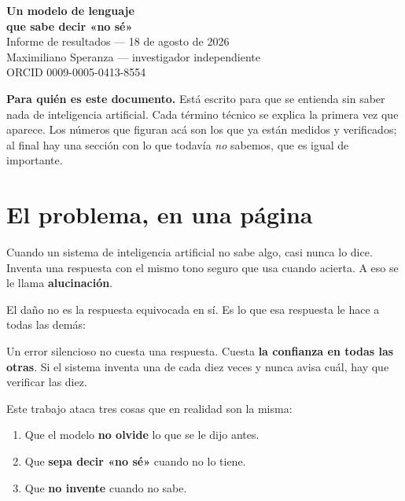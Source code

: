 \documentclass[11pt,a4paper]{article}
\begin{document}
\begin{center}
{\Huge\bfseries\color{azul} Un modelo de lenguaje\\[2pt] que sabe decir «no sé»}\\[10pt]
{\large Informe de resultados --- 18 de agosto de 2026}\\[4pt]
{\color{gris} Maximiliano Speranza --- investigador independiente}\\[2pt]
{\color{gris}\small ORCID 0009-0005-0413-8554}
\end{center}

\vspace{6pt}

\begin{caja}
\textbf{Para quién es este documento.} Está escrito para que se entienda sin saber nada de
inteligencia artificial. Cada término técnico se explica la primera vez que aparece. Los números
que figuran acá son los que ya están medidos y verificados; al final hay una sección con lo que
todavía \emph{no} sabemos, que es igual de importante.
\end{caja}

\section{El problema, en una página}

Cuando un sistema de inteligencia artificial no sabe algo, casi nunca lo dice. Inventa una
respuesta con el mismo tono seguro que usa cuando acierta. A eso se le llama \textbf{alucinación}.

El daño no es la respuesta equivocada en sí. Es lo que esa respuesta le hace a todas las demás:

\begin{caja}
Un error silencioso no cuesta una respuesta. Cuesta \textbf{la confianza en todas las otras}.
Si el sistema inventa una de cada diez veces y nunca avisa cuál, hay que verificar las diez.
\end{caja}

Este trabajo ataca tres cosas que en realidad son la misma:

\begin{enumerate}[label=\textbf{\arabic*.}]
  \item Que el modelo \textbf{no olvide} lo que se le dijo antes.
  \item Que \textbf{sepa decir «no sé»} cuando no lo tiene.
  \item Que \textbf{no invente} cuando no sabe.
\end{enumerate}
\end{document}
